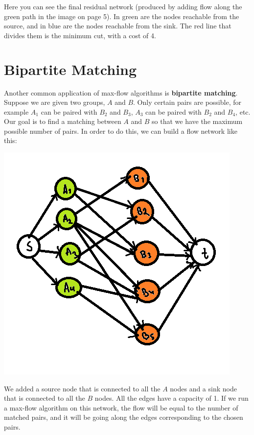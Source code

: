 \documentclass[12pt, letterpaper]{article}
\begin{document}
Here you can see the final residual network (produced by adding flow along the green path in the image on page 5). In green are the nodes reachable from the source, and in blue are the nodes reachable from the sink. The red line that divides them is the minimum cut, with a cost of 4.

\section{Bipartite Matching}
Another common application of max-flow algorithms is \textbf{bipartite matching}. Suppose we are given two groups, $A$ and $B$. Only certain pairs are possible, for example $A_1$ can be paired with $B_2$ and $B_3$, $A_3$ can be paired with $B_2$ and $B_4$, etc. Our goal is to find a matching between $A$ and $B$ so that we have the maximum possible number of pairs. In order to do this, we can build a flow network like this:

\includegraphics[scale=0.75]{figure7.png}

We added a source node that is connected to all the $A$ nodes and a sink node that is connected to all the $B$ nodes. All the edges have a capacity of 1. If we run a max-flow algorithm on this network, the flow will be equal to the number of matched pairs, and it will be going along the edges corresponding to the chosen pairs.
\end{document}
